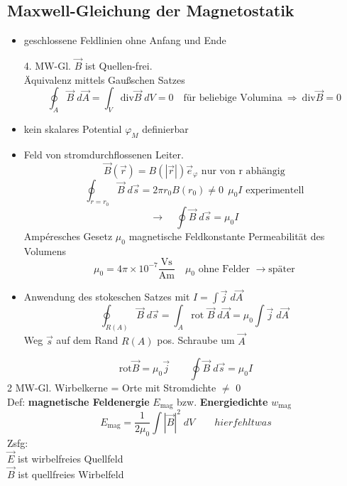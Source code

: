 \documentclass[titlepage,12pt,a4paper,ngerman]{report}
\newcommand{\tx}[1]{\textrm{#1}}
\begin{document}
\subsection{Maxwell-Gleichung der Magnetostatik}
\begin{itemize}
	\item geschlossene Feldlinien ohne Anfang und Ende\\
	\begin{center}
		\fbox{
			$\begin{array}{c}
			\tx{div } \vec{B}=0 \\
			\Phi_M = \oint_A \vec{B}\; d \vec{A}
			\end{array}$
		}
	\end{center}
	4. MW-Gl. $\vec{B}$ ist Quellen-frei.\\[5pt]
	Äquivalenz mittels Gaußschen Satzes
	$$\oint_A \vec{B}\; d \vec{A} = \int_V \tx{div} \vec{B}\; dV =0 \quad \tx{für beliebige Volumina}\ \Rightarrow \ \tx{div} \vec{B} =0$$
	\item kein skalares Potential $\varphi_M$ definierbar
	\item Feld von stromdurchflossenen Leiter. 
	$$\vec{B}(\vec{r})=B(|\vec{r}|) \vec{e}_\varphi \tx{ nur von r abhängig}$$
	$$\oint_{r=r_0}\vec{B}\;d\vec{s} = 2 \pi r_0 B(r_0) \neq 0 \ \  \mu_0 I \tx{ experimentell}$$
	$$\boxed{ \rightarrow \quad \oint\vec{B}\; d\vec{s}=\mu_0 I}$$ Ampéresches Gesetz $\mu_0$ magnetische Feldkonstante Permeabilität des Volumens
	$$\mu_0 = 4 \pi \times 10^{-7} \frac{\tx{Vs}}{\tx{Am}} \quad \mu_0 \tx{ ohne Felder } \rightarrow \tx{später}$$
	\item Anwendung des stokeschen Satzes mit $I= \int \vec{j} \; d \vec{A}$
	$$\oint_{R(A)}\vec{B} \; d\vec{s} = \int_A \tx{rot }\vec{B} \; d\vec{A} = \mu_0 \int \vec{j} \; d\vec{A}$$ 
	Weg $ \vec{s} $ auf dem Rand $ R(A) $ pos. Schraube um $ \vec{A} $
\end{itemize}
$$\boxed{\tx{rot} \vec{B} = \mu _0 \vec{j} \qquad \oint \vec{B} \; d \vec{s} = \mu _0 I}$$
2 MW-Gl. Wirbelkerne = Orte mit Stromdichte $\neq$ 0\\[5pt]
Def: \textbf{magnetische Feldenergie} $ E_{\tx{mag}} $ bzw. \textbf{Energiedichte} $ w_{\tx{mag}} $ 
$$ E_{\tx{mag}} = \frac{1}{2 \mu _0} \int|\vec{B}|^2 \; dV \qquad  hier fehlt was$$
Zsfg:\\
$ \vec{E} $ ist wirbelfreies Quellfeld\\
$ \vec{B} $ ist quellfreies Wirbelfeld
\end{document}
